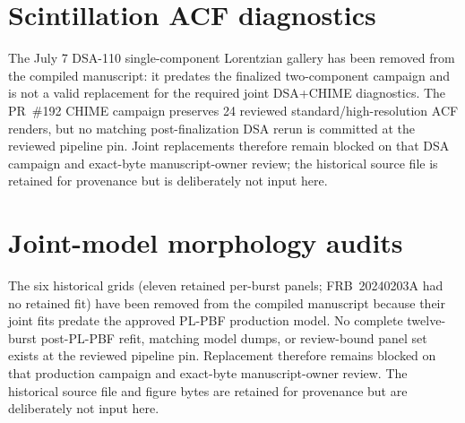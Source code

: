 \clearpage
\FloatBarrier

\section{Scintillation ACF diagnostics}
\label{app:dsa-scint-acf}

The July 7 DSA-110 single-component Lorentzian gallery has been removed from
the compiled manuscript: it predates the finalized two-component campaign and
is not a valid replacement for the required joint DSA+CHIME diagnostics. The
PR~\#192 CHIME campaign preserves 24 reviewed standard/high-resolution ACF
renders, but no matching post-finalization DSA rerun is committed at the
reviewed pipeline pin. Joint replacements therefore remain blocked on that DSA
campaign and exact-byte manuscript-owner review; the historical source file is
retained for provenance but is deliberately not input here.


\FloatBarrier



\FloatBarrier

\clearpage
\section{Joint-model morphology audits}
\label{app:jointmodel-pairs}

The six historical grids (eleven retained per-burst panels; FRB~20240203A had
no retained fit) have been removed from the compiled manuscript because their
joint fits predate the approved PL-PBF production model.  No complete
twelve-burst post-PL-PBF refit, matching model dumps, or review-bound panel set
exists at the reviewed pipeline pin.  Replacement therefore remains blocked
on that production campaign and exact-byte manuscript-owner review.  The
historical source file and figure bytes are retained for provenance but are
deliberately not input here.

\FloatBarrier
